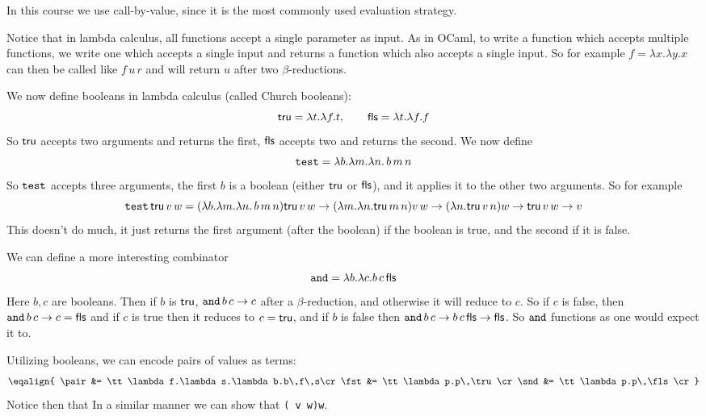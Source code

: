 In this course we use call-by-value, since it is the most commonly used evaluation strategy.

Notice that in lambda calculus, all functions accept a single parameter as input.
As in OCaml, to write a function which accepts multiple functions, we write one which accepts a single input and returns a function which also accepts a single input.
So for example $f=\lambda x.\lambda y.x$ can then be called like $f\,u\,r$ and will return $u$ after two $\beta$-reductions.

We now define booleans in lambda calculus (called Church booleans):
$$ \tru=\lambda t.\lambda f.t,\qquad \fls=\lambda t.\lambda f.f $$
So ${\sf tru}$ accepts two arguments and returns the first, ${\sf fls}$ accepts two and returns the second.
We now define
$$ \test=\lambda b.\lambda m.\lambda n.\,b\,m\,n $$
So $\test$ accepts three arguments, the first $b$ is a boolean (either ${\sf tru}$ or ${\sf fls}$), and it applies it to the other two arguments.
So for example
$$ \test\,\tru\,v\,w = (\lambda b.\lambda m.\lambda n.\,b\,m\,n)\tru\,v\,w \to (\lambda m.\lambda n.\tru\,m\,n)v\,w \to (\lambda n.\tru\,v\,n)w\to \tru\,v\,w \to v $$
This doesn't do much, it just returns the first argument (after the boolean) if the boolean is true, and the second if it is false.

We can define a more interesting combinator
$$ \and = \lambda b.\lambda c.b\,c\,\fls $$
Here $b,c$ are booleans.
Then if $b$ is ${\sf tru}$, $\and\,b\,c\to c$ after a $\beta$-reduction, and otherwise it will reduce to $c$.
So if $c$ is false, then $\and\,b\,c\to c=\fls$ and if $c$ is true then it reduces to $c={\sf tru}$, and if $b$ is false then $\and\,b\,c\to b\,c\,\fls\to\fls$.
So $\and$ functions as one would expect it to.

Utilizing booleans, we can encode pairs of values as terms:
$$ \eqalign{
    \pair &= \tt\lambda f.\lambda s.\lambda b.b\,f\,s\cr
    \fst &= \tt\lambda p.p\,\tru\cr
    \snd &= \tt\lambda p.p\,\fls\cr
} $$
Notice then that
In a similar manner we can show that {\tt \snd(\pair\ v w)\to w}.

